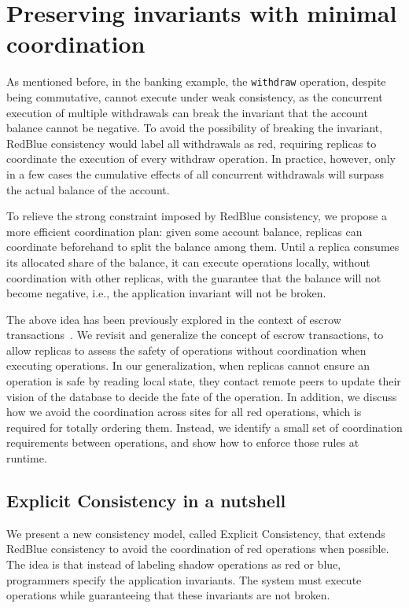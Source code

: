 \documentclass[11pt]{article}
\begin{document}
\section{Preserving invariants with minimal coordination}
\label{sec:indigo}
As mentioned before, in the banking example, the {\tt withdraw} operation, despite
being commutative, cannot execute under weak consistency, as the concurrent
execution of multiple withdrawals can break the invariant that
the account balance cannot be negative. To avoid the possibility of breaking the invariant, RedBlue consistency would
label all withdrawals as red, requiring replicas to coordinate
the execution of every withdraw operation. In practice, however, only in a few cases the cumulative effects of all concurrent withdrawals
will surpass the actual balance of the account.

To relieve the strong constraint imposed by RedBlue consistency, we propose a more efficient
coordination plan: given some
account balance, replicas can coordinate beforehand to split the balance
among them. Until a replica consumes its allocated
share of the balance, it can execute operations locally, without
coordination with other replicas, with the guarantee that
the balance will not become negative, i.e., the application invariant will
not be broken.

The above idea has been previously explored in the
context of escrow transactions~\cite{BarbaraMilla1994Demarcation,ONeil1986Escrow}.
We revisit and generalize the concept of escrow transactions, to allow replicas to
assess the safety of operations without coordination when executing operations.
In our generalization, when replicas cannot ensure an operation is safe by
reading local state, they contact remote peers to update their vision of the
database to decide the fate of the operation.
In addition, we discuss how we avoid the coordination across sites for
all red operations, which is required for totally ordering them. Instead,
we identify a small set of coordination requirements between operations, and show
how to enforce those rules at runtime.

\subsection{Explicit Consistency in a nutshell}
We present a new consistency model, called Explicit Consistency, that extends
RedBlue consistency to avoid the coordination of red operations when possible.
The idea is that instead of labeling shadow operations as red or blue,
programmers specify the application invariants.
The system must execute operations while guaranteeing that these invariants are
not broken.
\end{document}
